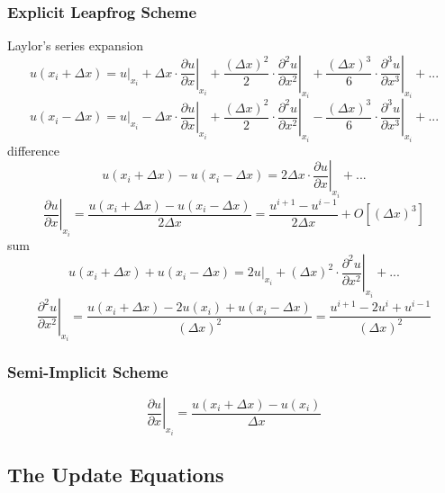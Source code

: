 \subsubsection{Explicit Leapfrog Scheme}
Laylor's series expansion 
\begin{equation}
  u(x_i+\Delta x) = u|_{x_i} + 
  \Delta x\cdot\left.\frac{\partial u}{\partial x}\right|_{x_i} + 
  \frac{(\Delta x)^2}{2}\cdot\left.\frac{\partial ^2 u}{\partial x^2}\right|_{x_i} + 
  \frac{(\Delta x)^3}{6}\cdot\left.\frac{\partial ^3 u}{\partial x^3}\right|_{x_i} + ...
\end{equation}
\begin{equation}
  u(x_i-\Delta x) = u|_{x_i} -
  \Delta x\cdot\left.\frac{\partial u}{\partial x}\right|_{x_i} + 
  \frac{(\Delta x)^2}{2}\cdot\left.\frac{\partial ^2 u}{\partial x^2}\right|_{x_i} -
  \frac{(\Delta x)^3}{6}\cdot\left.\frac{\partial ^3 u}{\partial x^3}\right|_{x_i} + ...
\end{equation}
difference 
\begin{equation}
  u(x_i+\Delta x) - u(x_i-\Delta x) = 2\Delta x\cdot\left.\frac{\partial u}{\partial x}\right|_{x_i}+...
\end{equation}
\begin{equation}
  \left.\frac{\partial u}{\partial x}\right|_{x_i} = \frac{u(x_i+\Delta x) - u(x_i-\Delta x)}{2\Delta x} = \frac{u^{i+1} - u^{i-1}}{2\Delta x} + O[(\Delta x)^3]
\end{equation}
sum 
\begin{equation}
  u(x_i+\Delta x) + u(x_i-\Delta x) = \left.2u\right|_{x_i} + (\Delta x)^2\cdot\left.\frac{\partial ^2 u}{\partial x^2}\right|_{x_i} + ...
\end{equation}
\begin{equation}
  \left.\frac{\partial^2 u}{\partial x^2}\right|_{x_i} = \frac{u(x_i+\Delta x) - 2u(x_i) + u(x_i-\Delta x)}{(\Delta x)^2} = \frac{u^{i+1} - 2u^i + u^{i-1}}{(\Delta x)^2} %
\end{equation}
\subsubsection{Semi-Implicit Scheme}
\begin{equation}
  \left.\frac{\partial u}{\partial x}\right|_{x_i} = \frac{u(x_i+\Delta x) - u(x_i)}{\Delta x}
\end{equation}

\subsection{The Update Equations}

